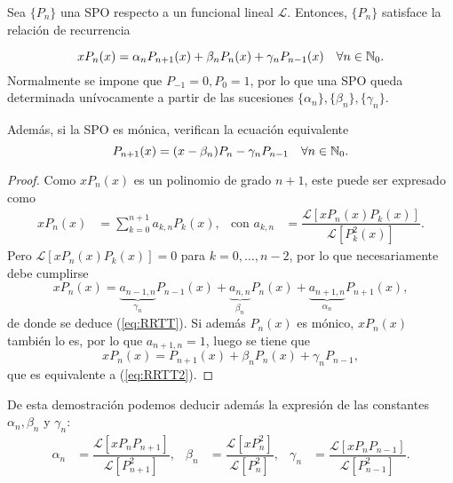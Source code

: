\begin{teorema} 
    \label{th:RRTT}
    Sea $\{P_n\}$ una SPO respecto a un funcional lineal $\mathcal L$. Entonces, $\{P_n\}$ satisface la relación de recurrencia

    \begin{equation}
        \label{eq:RRTT}
        xP_n(x) = \alpha_n P_{n+1}(x) + \beta_n P_n(x) + \gamma_n P_{n-1}(x) \ \ \ \forall n\in\mathbb{N}_0.
    \end{equation}
    Normalmente se impone que $P_{-1}=0, P_0 = 1$, por lo que una SPO queda determinada unívocamente a partir de las sucesiones $\{\alpha_n\},\{\beta_n\},\{\gamma_n\}$.

    Además, si la SPO es mónica, verifican la ecuación equivalente
    \begin{equation}
        \label{eq:RRTT2}
        P_{n+1}(x) = (x-\beta_n) P_n - \gamma_n P_{n-1} \ \ \ \forall n\in\mathbb{N}_0.
    \end{equation}
    
\end{teorema}
\begin{proof}
    Como $xP_n(x)$ es un polinomio de grado $n+1$, este puede ser expresado como 
    \begin{align*}
        xP_n(x) &= \sum_{k=0}^{n+1} a_{k,n} P_k(x), & \text{con } a_{k,n}&= \dfrac{\mathcal{L}[xP_n(x)P_k(x)]}{\mathcal{L}[P_k^2(x)]}. 
    \end{align*}
    Pero $\mathcal{L}[xP_n(x)P_k(x)]=0$ para $k=0,\dots,n-2$, por lo que necesariamente debe cumplirse
    $$
    xP_n(x)  = \underbrace{a_{n-1,n}}_{\gamma_n} P_{n-1}(x) + \underbrace{a_{n,n}}_{\beta_n} P_n(x) + \underbrace{a_{n+1,n}}_{\alpha_n} P_{n+1}(x),
    $$
    de donde se deduce (\ref{eq:RRTT}). Si además $P_n(x)$ es mónico, $xP_n(x)$ también lo es, por lo que $a_{n+1,n}=1$, luego se tiene que 
    $$ xP_n(x)  = P_{n+1}(x) + \beta_n P_n(x) + \gamma_n P_{n-1}, $$ que es equivalente a (\ref{eq:RRTT2}).
\end{proof}

De esta demostración podemos deducir además la expresión de las constantes $\alpha_n, \beta_n$ y $\gamma_n$:
\begin{align}
    \label{eq:ctes-RRTT}
    \alpha_n &= \dfrac{\mathcal{L}[xP_n P_{n+1}]}{\mathcal{L}[P_{n+1}^2]}, & \beta_n &= \dfrac{\mathcal{L}[xP_n^2]}{\mathcal{L}[P_n^2]}, & \gamma_n &= \dfrac{\mathcal{L}[xP_n P_{n-1}]}{\mathcal{L}[P_{n-1}^2]}.
\end{align}

